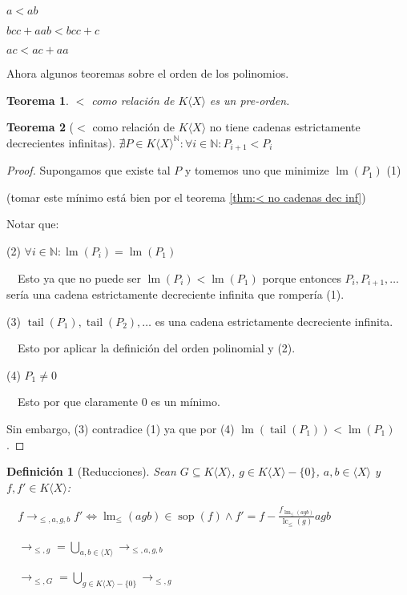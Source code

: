 \documentclass{amsbook}
\theoremstyle{customstyle}
\newtheorem{definition}{Definición}[section]
\newtheorem{theorem}{Teorema}[section]
\DeclareMathOperator{\sop}{sop}
\DeclareMathOperator{\lm}{lm}
\DeclareMathOperator{\lc}{lc}
\DeclareMathOperator{\tail}{tail}
\begin{document}
$a < ab$

$bcc + aab < bcc + c$

$ac < ac + aa$

Ahora algunos teoremas sobre el orden de los polinomios.

\begin{theorem}
$<$ como relación de $K⟨X⟩$ es un pre-orden.
\end{theorem}

\begin{theorem}[$<$ como relación de $K⟨X⟩$ no tiene cadenas estrictamente decrecientes infinitas]\label{thm:< en KX no cadenas dec inf}
  $∄P ∈ K⟨X⟩^ℕ : ∀i ∈ ℕ : P_{i + 1} < P_i$
\end{theorem}
\begin{proof}
Supongamos que existe tal $P$ y tomemos uno que minimize $\lm(P_1)$ (1)

(tomar este mínimo está bien por el teorema \ref{thm:< no cadenas dec inf}) %

Notar que:

(2) $∀i ∈ ℕ : \lm(P_i) = \lm(P_1)$

  Esto ya que no puede ser $\lm(P_i) < \lm(P_1)$ porque entonces $P_i, P_{i + 1}, …$ sería una cadena estrictamente decreciente infinita que rompería (1).


(3) $\tail(P_1), \tail(P_2), …$ es una cadena estrictamente decreciente infinita.

  Esto por aplicar la definición del orden polinomial y (2).

(4) $P_1 ≠ 0$

  Esto por que claramente $0$ es un mínimo.

Sin embargo, (3) contradice (1) ya que por (4) $\lm(\tail(P_1)) < \lm(P_1)$.

\end{proof}

\begin{definition}[Reducciones]
Sean $G ⊆ K⟨X⟩$, $g ∈ K⟨X⟩ - \{0\}$, $a, b ∈ ⟨X⟩$ y $f, f' ∈ K⟨X⟩$:

  $f →_{≤, a, g, b} f' ⇔ \lm_≤(agb) ∈ \sop(f) ∧ f' = f - \frac{f_{\lm_≤(agb)}}{\lc_≤(g)}agb$

  $→_{≤, g} = \bigcup_{a, b ∈ ⟨X⟩} →_{≤, a, g, b}$

  $→_{≤, G} = \bigcup_{g ∈ K⟨X⟩ - \{0\}} →_{≤, g}$
\end{definition}
\end{document}
